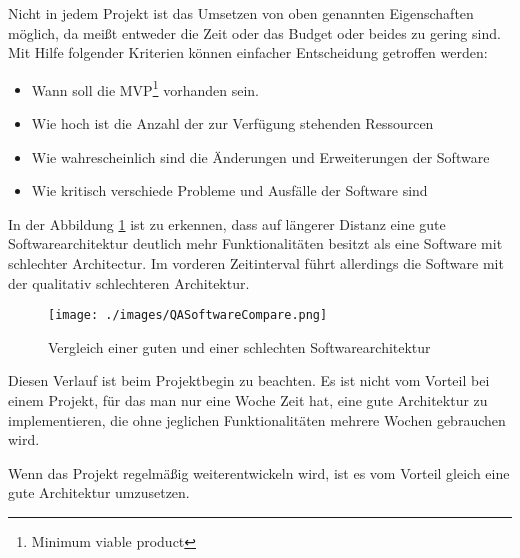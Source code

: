     Nicht in jedem Projekt ist das Umsetzen von oben genannten Eigenschaften möglich, 
    da meißt entweder die Zeit oder das Budget oder beides zu gering sind.
    Mit Hilfe folgender Kriterien können einfacher Entscheidung getroffen werden:
    \begin{itemize}
        \item Wann soll die MVP\footnote[1]{Minimum viable product} vorhanden sein.
        \item Wie hoch ist die Anzahl der zur Verfügung stehenden Ressourcen
        \item Wie wahrescheinlich sind die Änderungen und Erweiterungen der Software
        \item Wie kritisch verschiede Probleme und Ausfälle der Software sind 
    \end{itemize}

    In der Abbildung \ref{fig:softQuality} ist zu erkennen, dass auf längerer Distanz eine gute Softwarearchitektur deutlich mehr Funktionalitäten 
    besitzt als eine Software mit schlechter Architectur. Im vorderen Zeitinterval führt allerdings die Software mit der qualitativ schlechteren Architektur.
    \begin{figure}[H]
        \centering
        \texttt{[image: ./images/QASoftwareCompare.png]}
        \caption[Vergleich einer guten und einer schlechten Softwarearchitektur]{Vergleich einer guten und einer schlechten Softwarearchitektur \footnotemark}
        \label{fig:softQuality}
    \end{figure}
    Diesen Verlauf ist beim Projektbegin zu beachten. Es ist nicht vom Vorteil bei einem Projekt, 
    für das man nur eine Woche Zeit hat, eine gute Architektur zu implementieren, die ohne jeglichen Funktionalitäten mehrere Wochen gebrauchen wird.

    Wenn das Projekt regelmäßig weiterentwickeln wird, ist es vom Vorteil gleich eine gute Architektur umzusetzen.
